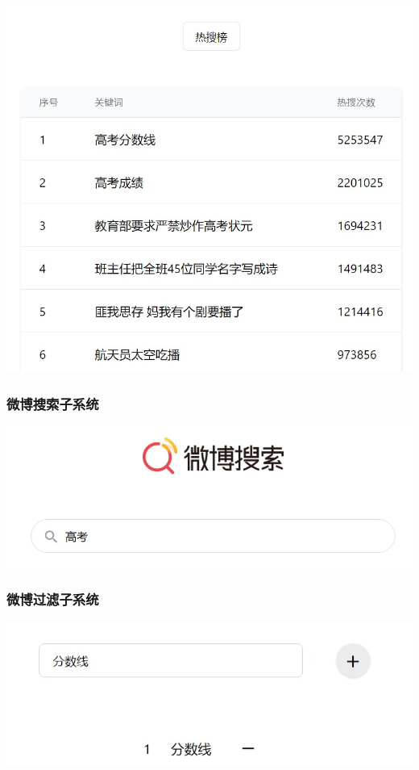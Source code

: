 \documentclass{ctexart}
\begin{document}
\includegraphics[width=\textwidth]{trend.jpeg}



\subsubsection{微博搜索子系统}

\includegraphics[width=\textwidth]{search.jpeg}


\subsubsection{微博过滤子系统}

\includegraphics[width=\textwidth]{filter.jpeg}
\end{document}
